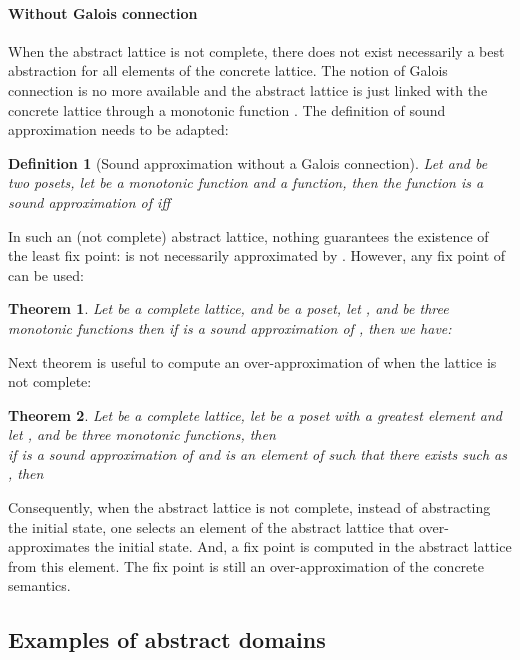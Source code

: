 \documentclass[submission,copyright,creativecommons]{eptcs}
\newtheorem{definition}{Definition}
\newtheorem{theorem}{Theorem}
\begin{document}
\paragraph{Without Galois connection}

When the abstract lattice is not complete, there does not exist necessarily a best
abstraction for all elements of the concrete lattice. The notion of Galois connection is
no more available and the abstract lattice is just linked with the concrete lattice
through a monotonic function .
The definition of sound approximation needs to be adapted:
\begin{definition} [Sound approximation without a Galois connection]
  Let  and
   be two posets, let 
   be a monotonic function and 
   a function, then the function
   is a sound approximation of  iff

\end{definition}
\noindent
In such an (not complete) abstract lattice, nothing guarantees the existence of the least fix point:
 is not necessarily approximated by . However, any fix point of  can be
used:
\begin{theorem}
  Let  be a complete lattice, and  be a poset, let
  ,  and  be three monotonic functions then
if  is a sound approximation of , then we have:

\end{theorem}
\noindent
Next theorem is useful to compute an over-approximation of  when the lattice is not complete:
\begin{theorem}
\label{theo:gfp_incomplet}
  Let  be a complete lattice, let  be a poset with
  a greatest element  and let
  ,  and  be three monotonic functions, then
  \\
  if  is a sound approximation of  and  is an
  element of  such that there exists  such as , then

\end{theorem}
\noindent
Consequently, when the abstract lattice is not complete, instead of
abstracting the initial state, one selects
an element of the abstract lattice that over-approximates the initial state.
And, a fix point is computed in the abstract lattice from this element.
The fix point is still an over-approximation of the concrete semantics.

\subsection{Examples of abstract domains}
\label{sec:ia:exemples}
\end{document}
